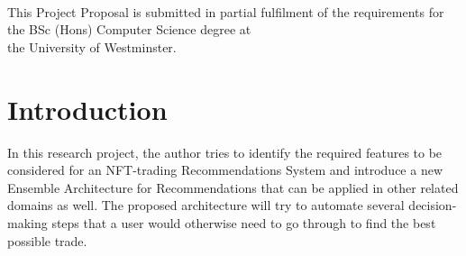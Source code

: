 \documentclass[a4paper, 12pt, oneside]{report}
\begin{document}
\begin{titlepage}
\begin{center}
\\[0.1cm]
\\[1cm]


\vfill
{}\\[0.1cm]

\vfill
\large{This Project Proposal is submitted in partial fulfilment of the requirements for \\the BSc (Hons) Computer Science degree at \\the University of Westminster.} \\[0.1cm]

 

 
\end{center}
 
\end{titlepage}


\tableofcontents

{\let\clearpage\relax
\listoffigures}
{\let\clearpage\relax
\listoftables}
{\let\clearpage\relax
\printglossary[type=\acronymtype
]}


\onehalfspacing %

\chapter{Introduction}

\setcounter{page}{1} %

 In this research project, the author tries to identify the required features to be considered for an NFT-trading Recommendations System and introduce a new Ensemble Architecture for Recommendations that can be applied in other related domains as well. The proposed architecture will try to automate several decision-making steps that a user would otherwise need to go through to find the best possible trade.
\end{document}
